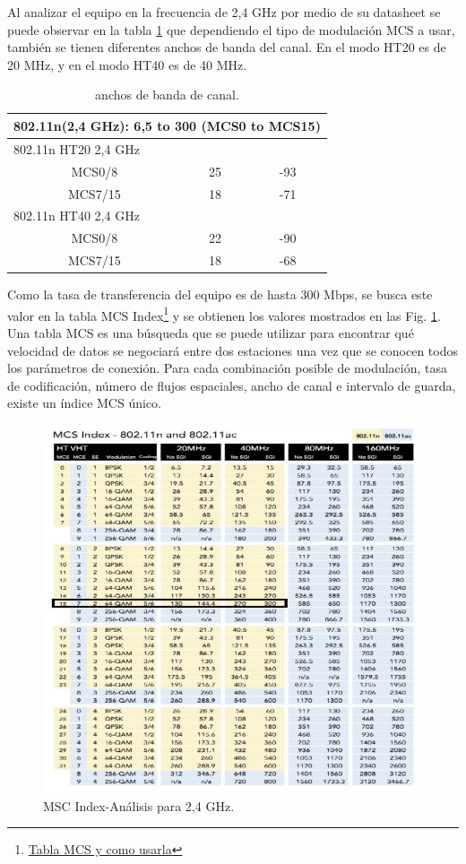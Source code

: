 \documentclass[11pt,a4paper]{article}
\begin{document}
Al analizar el equipo en la frecuencia de 2,4 GHz por medio de su datasheet se puede observar en la tabla \ref{tab:anchos_banda_canal} que dependiendo el tipo de modulación MCS a usar, también se tienen diferentes anchos de banda del canal. 
En el modo HT20 es de 20 MHz, y en el modo HT40 es de 40 MHz. 

\begin{table}[htbp]
  \centering
    \begin{tabular}{|c|c|c|}
    \hline
    \multicolumn{3}{|c|}{802.11n(2,4 GHz): 6,5 to 300 (MCS0 to MCS15)} \bigstrut\\
    \hline
    \multicolumn{3}{|l|}{802.11n HT20 2,4 GHz} \bigstrut\\
    \hline
    MCS0/8 & 25   & -93 \bigstrut\\
    \hline
    MCS7/15 & 18   & -71 \bigstrut\\
    \hline
    \multicolumn{3}{|l|}{802.11n HT40 2,4 GHz} \bigstrut\\
    \hline
    MCS0/8 & 22   & -90 \bigstrut\\
    \hline
    MCS7/15 & 18   & -68 \bigstrut\\
    \hline
    \end{tabular}%
  \caption{anchos de banda de canal.}
  \label{tab:anchos_banda_canal}%
\end{table}%
 

Como la tasa de transferencia del equipo es de hasta 300 Mbps, se busca este valor en la tabla MCS Index\footnote{\href{https://wlanprofessionals.com/mcs-table-and-how-to-use-it/}{Tabla MCS y como usarla}} y se obtienen los valores mostrados en las Fig. \ref{fig:msc_index_2_4GHz}. 
Una tabla MCS es una búsqueda que se puede utilizar para encontrar qué velocidad de datos se negociará entre dos estaciones una vez que se conocen todos los parámetros de conexión. 
Para cada combinación posible de modulación, tasa de codificación, número de flujos espaciales, ancho de canal e intervalo de guarda, existe un índice MCS único.


\begin{figure}[htbp]
  \centering
  \includegraphics[width=0.5\linewidth]{fotos_ema/msc_index_2_4GHz.jpg}
  \caption{MSC Index-Análisis para 2,4 GHz.}
  \label{fig:msc_index_2_4GHz}
\end{figure}
\end{document}
